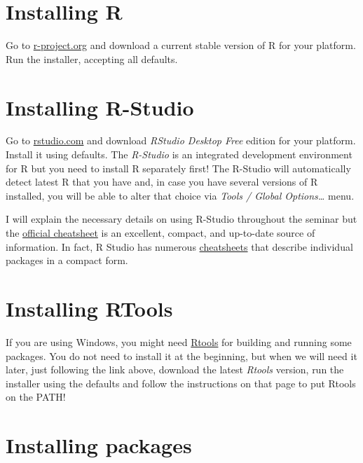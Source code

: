 \documentclass[
]{book}
\begin{document}
\hypertarget{install-r}{%
\section*{Installing R}\label{install-r}}

Go to \href{https://cloud.r-project.org/}{r-project.org} and download a current stable version of R for your platform. Run the installer, accepting all defaults.

\hypertarget{install-rstudio}{%
\section*{Installing R-Studio}\label{install-rstudio}}

Go to \href{https://rstudio.com/products/rstudio/download/}{rstudio.com} and download \emph{RStudio Desktop Free} edition for your platform. Install it using defaults. The \emph{R-Studio} is an integrated development environment for R but you need to install R separately first! The R-Studio will automatically detect latest R that you have and, in case you have several versions of R installed, you will be able to alter that choice via \emph{Tools / Global Options\ldots{}} menu.

I will explain the necessary details on using R-Studio throughout the seminar but the \href{https://github.com/rstudio/cheatsheets/raw/master/rstudio-ide.pdf}{official cheatsheet} is an excellent, compact, and up-to-date source of information. In fact, R Studio has numerous \href{https://rstudio.com/resources/cheatsheets/}{cheatsheets} that describe individual packages in a compact form.

\hypertarget{install-rtools}{%
\section*{Installing RTools}\label{install-rtools}}

If you are using Windows, you might need \href{https://cran.r-project.org/bin/windows/Rtools/}{Rtools} for building and running some packages. You do not need to install it at the beginning, but when we will need it later, just following the link above, download the latest \emph{Rtools} version, run the installer using the defaults and follow the instructions on that page to put Rtools on the PATH!

\hypertarget{install.packages}{%
\section*{Installing packages}\label{install.packages}}
\end{document}
